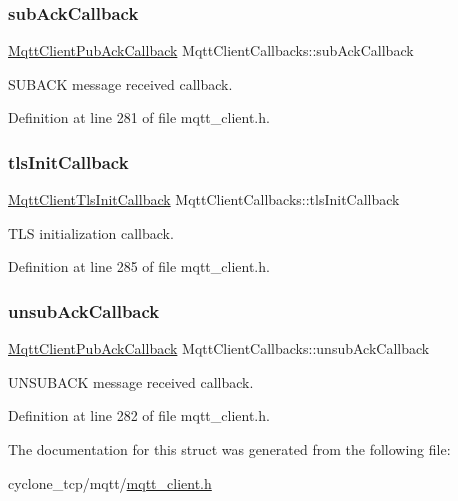 \subsubsection{\texorpdfstring{sub\+Ack\+Callback}{subAckCallback}}
{\footnotesize\ttfamily \hyperlink{mqtt__client_8h_a795fdcc921902cd871b766c91770a469}{Mqtt\+Client\+Pub\+Ack\+Callback} Mqtt\+Client\+Callbacks\+::sub\+Ack\+Callback}



S\+U\+B\+A\+CK message received callback. 



Definition at line 281 of file mqtt\+\_\+client.\+h.

\mbox{\label{structMqttClientCallbacks_acb3ae72083fa6a17a54fff91e1556f6a}} 
\subsubsection{\texorpdfstring{tls\+Init\+Callback}{tlsInitCallback}}
{\footnotesize\ttfamily \hyperlink{mqtt__client_8h_ac122290bec99c3ea07b3c1e3e727fa07}{Mqtt\+Client\+Tls\+Init\+Callback} Mqtt\+Client\+Callbacks\+::tls\+Init\+Callback}



T\+LS initialization callback. 



Definition at line 285 of file mqtt\+\_\+client.\+h.

\mbox{\label{structMqttClientCallbacks_a1d5aabcfb19fef46e5bc90529e086e5c}} 
\subsubsection{\texorpdfstring{unsub\+Ack\+Callback}{unsubAckCallback}}
{\footnotesize\ttfamily \hyperlink{mqtt__client_8h_a795fdcc921902cd871b766c91770a469}{Mqtt\+Client\+Pub\+Ack\+Callback} Mqtt\+Client\+Callbacks\+::unsub\+Ack\+Callback}



U\+N\+S\+U\+B\+A\+CK message received callback. 



Definition at line 282 of file mqtt\+\_\+client.\+h.



The documentation for this struct was generated from the following file\+:\begin{DoxyCompactItemize}
\item 
cyclone\+\_\+tcp/mqtt/\hyperlink{mqtt__client_8h}{mqtt\+\_\+client.\+h}\end{DoxyCompactItemize}

